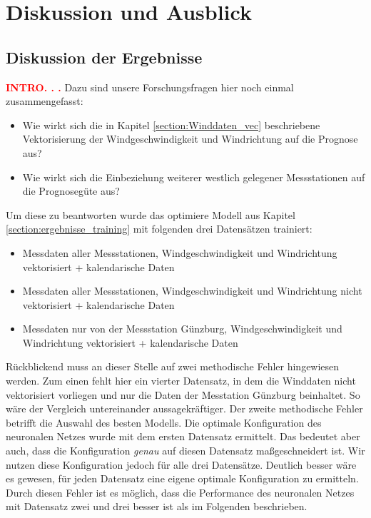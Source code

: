 \documentclass[
12pt, %
toc=listofnumbered, %
toc=chapterentrydotfill, %
numbers=noenddot, %
captions=tableheading, %
bibliography=numbered
]{scrreprt}
\let\Oldsection\section
\renewcommand{\section}{\FloatBarrier\Oldsection}
\newcommand{\qm}[1]{\glqq#1\grqq{}} %
\newcommand{\highlight}[1]{\textbf{\textcolor{red}{#1}}}
\begin{document}
\chapter{Diskussion und Ausblick}

\section{Diskussion der Ergebnisse}
\highlight{INTRO. . .} Dazu sind unsere Forschungsfragen hier noch einmal zusammengefasst:

\begin{itemize}
	\item Wie wirkt sich die in Kapitel \ref{section:Winddaten_vec} beschriebene Vektorisierung der Windgeschwindigkeit und Windrichtung auf die Prognose aus?
	\item Wie wirkt sich die Einbeziehung weiterer westlich gelegener Messstationen auf die Prognosegüte aus?
\end{itemize}

Um diese zu beantworten wurde das optimiere Modell aus Kapitel \ref{section:ergebnisse_training} mit folgenden drei Datensätzen trainiert:

\begin{itemize}
	\item Messdaten aller Messstationen, Windgeschwindigkeit und Windrichtung vektorisiert + kalendarische Daten
	\item Messdaten aller Messstationen, Windgeschwindigkeit und Windrichtung nicht vektorisiert + kalendarische Daten
	\item Messdaten nur von der Messstation Günzburg, Windgeschwindigkeit und Windrichtung vektorisiert + kalendarische Daten
\end{itemize}

Rückblickend muss an dieser Stelle auf zwei methodische Fehler hingewiesen werden. Zum einen fehlt hier ein vierter Datensatz, in dem die Winddaten nicht vektorisiert vorliegen und nur die Daten der Messtation Günzburg beinhaltet. So wäre der Vergleich untereinander aussagekräftiger. Der zweite methodische Fehler betrifft die Auswahl des besten Modells. Die optimale Konfiguration des neuronalen Netzes wurde mit dem ersten Datensatz ermittelt. Das bedeutet aber auch, dass die Konfiguration \textit{genau} auf diesen Datensatz \qm{maßgeschneidert} ist. Wir nutzen diese Konfiguration jedoch für alle drei Datensätze. Deutlich besser wäre es gewesen, für jeden Datensatz eine eigene optimale Konfiguration zu ermitteln. Durch diesen Fehler ist es möglich, dass die Performance des neuronalen Netzes mit Datensatz zwei und drei besser ist als im Folgenden beschrieben.
\end{document}

